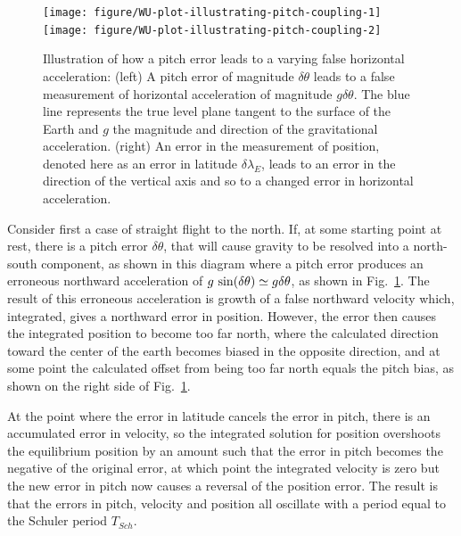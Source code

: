 \documentclass[12pt,twoside,english]{article}\usepackage[]{graphicx}\usepackage[]{color}
\newenvironment{knitrout}{}{} %
\begin{document}
\begin{knitrout}\footnotesize
{}\color{fgcolor}\begin{figure}

{\centering \texttt{[image: figure/WU-plot-illustrating-pitch-coupling-1]} 
\texttt{[image: figure/WU-plot-illustrating-pitch-coupling-2]} 

}

\caption[Illustration of how a pitch error leads to a varying false horizontal acceleration]{Illustration of how a pitch error leads to a varying false horizontal acceleration: (left) A pitch error of magnitude $\delta\theta$ leads to a false measurement of horizontal acceleration of magnitude $g\delta\theta$. The blue line represents the true level plane tangent to the surface of the Earth and $g$ the magnitude and direction of the gravitational acceleration. (right) An error in the measurement of position, denoted here as an error in latitude $\delta\lambda_E$, leads to an error in the direction of the vertical axis and so to a changed error in horizontal acceleration.}\label{fig:plot-illustrating-pitch-coupling}
\end{figure}


\end{knitrout}


Consider first a case of straight flight to the north. If, at some starting point at rest, there is a pitch error $\delta\theta$, that will cause gravity to be resolved into a north-south component, as shown in this diagram where a pitch error produces an erroneous northward acceleration of $g\thinspace\sin(\delta\theta)\simeq g\delta\theta$, as shown in Fig.~\ref{fig:plot-illustrating-pitch-coupling}.
The result of this erroneous acceleration is growth of a false northward velocity which, integrated, gives a northward error in position. However, the error then causes the integrated position to become too far north, where the calculated direction toward the center of the earth becomes biased in the opposite direction, and at some point the calculated offset from being too far north equals the pitch bias, as shown on the right side of Fig.~\ref{fig:plot-illustrating-pitch-coupling}.

At the point where the error in latitude cancels the error in pitch, there is an accumulated error in velocity, so the integrated solution for position overshoots the equilibrium position by an amount such that the error in pitch becomes the negative of the original error, at which point the integrated velocity is zero but the new error in pitch now causes a reversal of the position error. The result is that the errors in pitch, velocity and position all oscillate with a period equal to the Schuler period $T_{Sch}$. 
\end{document}
